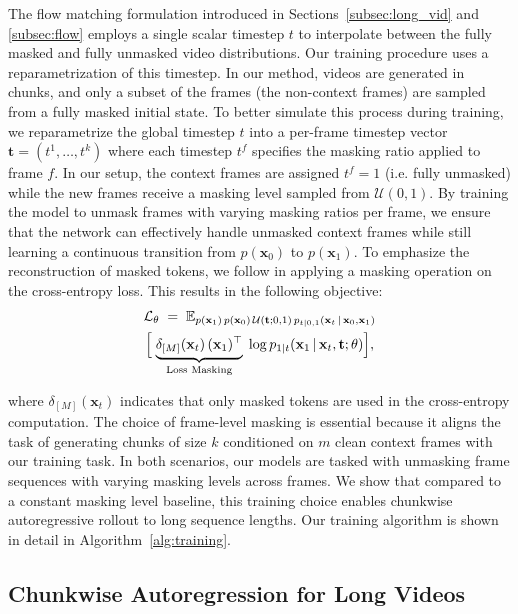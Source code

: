 The flow matching formulation introduced in Sections~\ref{subsec:long_vid} and \ref{subsec:flow} employs a single scalar timestep $t$ to interpolate between the fully masked and fully unmasked video distributions. Our training procedure uses a reparametrization of this timestep. In our method, videos are generated in chunks, and only a subset of the frames (the non-context frames) are sampled from a fully masked initial state. To better simulate this process during training, we reparametrize the global timestep $t$ into a per-frame timestep vector $\mathbf{t}=(t^1,\dots, t^k)$ where each timestep $t^f$ specifies the masking ratio applied to frame $f$. In our setup, the context frames are assigned $t^f = 1$ (i.e. fully unmasked) while the new frames receive a masking level sampled from $\mathcal{U}(0,1)$.
By training the model to unmask frames with varying masking ratios per frame, we ensure that the network can effectively handle unmasked context frames while still learning a continuous transition from $p(\mathbf{x}_0)$ to $p(\mathbf{x}_1)$. To emphasize the reconstruction of masked tokens, we follow \cite{hu2024maskneed} in applying a masking operation on the cross-entropy loss. This results in the following objective:
\begin{multline}
\label{eq:ce_loss_masked}
    \mathcal{L}_{\theta} \;=\; 
    \mathbb{E}_{p(\mathbf{x}_1)\,p(\mathbf{x}_0)\,\mathcal{U}(\mathbf{t};0,1)\,p_{t|0,1}(\mathbf{x}_t \,\vert\, \mathbf{x}_0,\mathbf{x}_1)} \\
    \Bigl[\;\underbrace{\delta_{[M]}(\mathbf{x}_t)\,( \mathbf{x}_1 )^\top}_{\text{Loss Masking}}
    \;\log p_{1|t}(\mathbf{x}_1 \,\vert\, \mathbf{x}_t,\mathbf{t};\theta) 
    \Bigr],
\end{multline}

where $\delta_{[M]}(\mathbf{x}_t)$ indicates that only masked tokens are used in the cross-entropy computation. The choice of frame-level masking is essential because it aligns the task of generating chunks of size $k$ conditioned on $m$ clean context frames with our training task. In both scenarios, our models are tasked with unmasking frame sequences with varying masking levels across frames. We show that compared to a constant masking level baseline, this training choice enables chunkwise autoregressive rollout to long sequence lengths. Our training algorithm is shown in detail in Algorithm~\ref{alg:training}.

\subsection{Chunkwise Autoregression for Long Videos}
\label{sec:flex_long}

